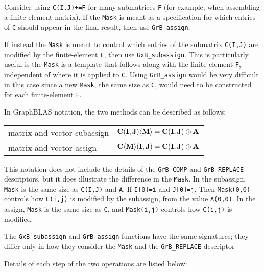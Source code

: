 \documentclass[12pt]{article}
\begin{document}
Consider using \verb'C(I,J)+=F' for many submatrices \verb'F' (for example,
when assembling a finite-element matrix).  If the \verb'Mask' is meant as a
specification for which entries of \verb'C' should appear in the final result,
then use \verb'GrB_assign'.

If instead the \verb'Mask' is meant to control which entries of the submatrix
\verb'C(I,J)' are modified by the finite-element \verb'F', then use
\verb'GxB_subassign'.  This is particularly useful is the \verb'Mask' is a
template that follows along with the finite-element \verb'F', independent of
where it is applied to \verb'C'.  Using \verb'GrB_assign' would be very
difficult in this case since a new \verb'Mask', the same size as \verb'C',
would need to be constructed for each finite-element \verb'F'.

In GraphBLAS notation, the two methods can be described as follows:

\vspace{0.05in}
\begin{tabular}{ll}
\hline
matrix and vector subassign & ${\bf C(I,J) \langle M \rangle}  = {\bf C(I,J)} \odot {\bf A}$ \\
matrix and vector    assign & ${\bf C \langle M \rangle (I,J)} = {\bf C(I,J)} \odot {\bf A}$ \\
\hline
\end{tabular}
\vspace{0.05in}

This notation does not include the details of the \verb'GrB_COMP' and
\verb'GrB_REPLACE' descriptors, but it does illustrate the difference in the
\verb'Mask'.  In the subassign, \verb'Mask' is the same size as \verb'C(I,J)'
and \verb'A'.  If \verb'I[0]=i' and \verb'J[0]=j', Then \verb'Mask(0,0)'
controls how \verb'C(i,j)' is modified by the subassign, from the value
\verb'A(0,0)'.  In the assign, \verb'Mask' is the same size as \verb'C', and
\verb'Mask(i,j)' controls how \verb'C(i,j)' is modified.

The \verb'GxB_subassign' and \verb'GrB_assign' functions have the same
signatures; they differ only in how they consider the \verb'Mask' and the
\verb'GrB_REPLACE' descriptor

Details of each step of the two operations are listed below:
\end{document}
